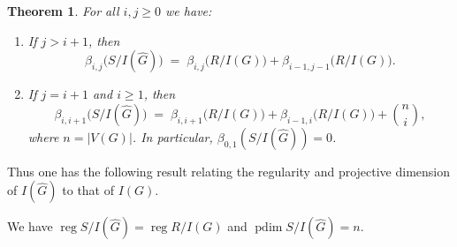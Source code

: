 \documentclass[12pt]{amsart}
\theoremstyle{plain}
\newtheorem{thm}{Theorem}[section]
\theoremstyle{definition}
\DeclareMathOperator{\reg}{reg}
\DeclareMathOperator{\pdim}{pdim}
\begin{document}
\begin{thm}\label{thm:full-cone-betti}
For all $i,j\ge 0$ we have:
\begin{enumerate}
\item[(1)] If $j>i+1$, then
\[
\beta_{i,j}\bigl(S/I(\widehat{G})\bigr)
\;=\;
\beta_{i,j}\bigl(R/I(G)\bigr)+\beta_{i-1,j-1}\bigl(R/I(G)\bigr).
\]
\item[(2)] If $j=i+1$ and $i\ge 1$, then
\[
\beta_{i,i+1}\bigl(S/I(\widehat{G})\bigr)
\;=\;
\beta_{i,i+1}\bigl(R/I(G)\bigr)+\beta_{i-1,i}\bigl(R/I(G)\bigr)+\binom{n}{i},
\]
where $n=|V(G)|$. In particular, $\beta_{0,1}(S/I(\widehat{G}))=0$.
\end{enumerate}
\end{thm}



Thus one has the following result relating the regularity and projective dimension of $I(\widehat{G})$ to that of $I(G)$. 
\begin{cor}\label{cor:full-cone-reg-pdim}
We have $\reg S/I(\widehat{G})=\reg R/I(G)$ and  $\pdim S/I(\widehat{G}) = n$.
\end{cor}

\end{document}

